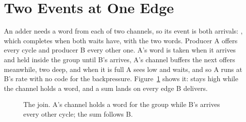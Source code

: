 \section{Two Events at One Edge}
\label{sec:x-join}

An adder needs a word from each of two channels, so its event is
both arrivals: , which
completes when both waits have, with the two words. Producer A offers
every cycle and producer B every other one. A's word is taken when it
arrives and held inside the group until B's arrives, A's channel
buffers the next offers meanwhile, two deep, and when it is full A
sees  low and waits, and so A runs at B's rate with no
code for the backpressure. Figure~\ref{fig:x-join} shows it:
 stays high while the channel holds a word, and a sum
lands on every edge B delivers.

\begin{figure}[htbp]
\centering

\caption{The join. A's channel holds a word for the group while B's arrives every other cycle; the sum follows B.}
\label{fig:x-join}
\end{figure}




